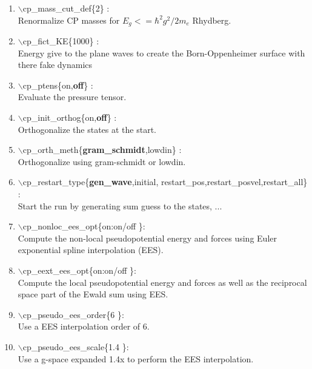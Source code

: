 \documentclass[12pt]{article}
\begin{document}
\begin{enumerate}
 \vspace{0.15in} 
 \item  $\backslash$cp\_mass\_cut\_def\{2\} : \\
      Renormalize CP masses for $E_g<=\hbar^2g^2/2m_e$ Rhydberg.

 \vspace{0.15in} 
 \item  $\backslash$cp\_fict\_KE\{1000\} : \\
      Energy give to the plane waves to create the Born-Oppenheimer
      surface with there fake dynamics

 \vspace{0.15in} 
 \item  $\backslash$cp\_ptens\{on,{\bf off}\} : \\
      Evaluate the pressure tensor. 

 \vspace{0.15in} 
 \item  $\backslash$cp\_init\_orthog\{on,{\bf off}\} : \\
      Orthogonalize the states at the start.

 \vspace{0.15in} 
 \item  $\backslash$cp\_orth\_meth\{{\bf gram\_schmidt},lowdin\} : \\
      Orthogonalize using gram-schmidt or lowdin.

 \vspace{0.15in} 
 \item  $\backslash$cp\_restart\_type\{{\bf gen\_wave},initial,
                         restart\_pos,restart\_posvel,restart\_all\} : \\
      Start the run by generating sum guess to the states, ...

 \vspace{0.15in} 
 \item  $\backslash$cp\_nonloc\_ees\_opt\{on:on/off \}: \\     
 Compute the non-local pseudopotential energy and forces using Euler
 exponential spline interpolation (EES).

 \vspace{0.15in} 
 \item  $\backslash$cp\_eext\_ees\_opt\{on:on/off \}: \\     
     Compute the local pseudopotential energy and forces as well as the 
     reciprocal space part of the Ewald sum using  EES.

 \vspace{0.15in} 
 \item  $\backslash$cp\_pseudo\_ees\_order\{6 \}: \\     
     Use a EES interpolation order of 6.

 \vspace{0.15in} 
 \item  $\backslash$cp\_pseudo\_ees\_scale\{1.4 \}: \\     
     Use a g-space expanded 1.4x to perform the EES interpolation.
\end{enumerate}
\end{document}
